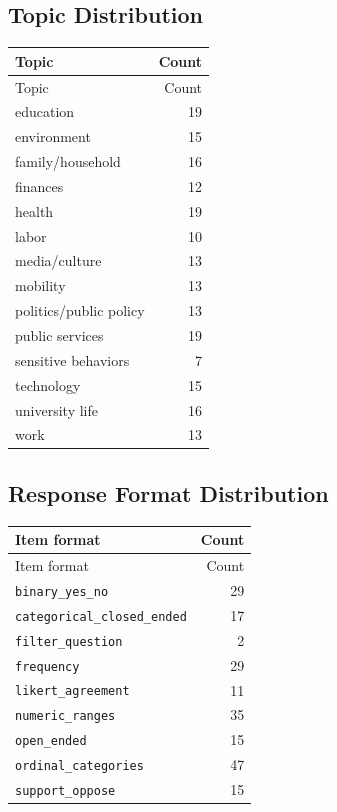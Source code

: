 \documentclass[10pt,a4paper]{article}
\begin{document}
\subsection{Topic Distribution}
\begin{longtable}{@{}lr@{}}
\toprule
Topic & Count\\
\midrule
\endfirsthead
\toprule
Topic & Count\\
\midrule
\endhead
education & 19\\
environment & 15\\
family/household & 16\\
finances & 12\\
health & 19\\
labor & 10\\
media/culture & 13\\
mobility & 13\\
politics/public policy & 13\\
public services & 19\\
sensitive behaviors & 7\\
technology & 15\\
university life & 16\\
work & 13\\
\bottomrule
\end{longtable}
\subsection{Response Format Distribution}
\begin{longtable}{@{}lr@{}}
\toprule
Item format & Count\\
\midrule
\endfirsthead
\toprule
Item format & Count\\
\midrule
\endhead
\texttt{binary\_yes\_no} & 29\\
\texttt{categorical\_closed\_ended} & 17\\
\texttt{filter\_question} & 2\\
\texttt{frequency} & 29\\
\texttt{likert\_agreement} & 11\\
\texttt{numeric\_ranges} & 35\\
\texttt{open\_ended} & 15\\
\texttt{ordinal\_categories} & 47\\
\texttt{support\_oppose} & 15\\
\bottomrule
\end{longtable}
\newpage
\end{document}
